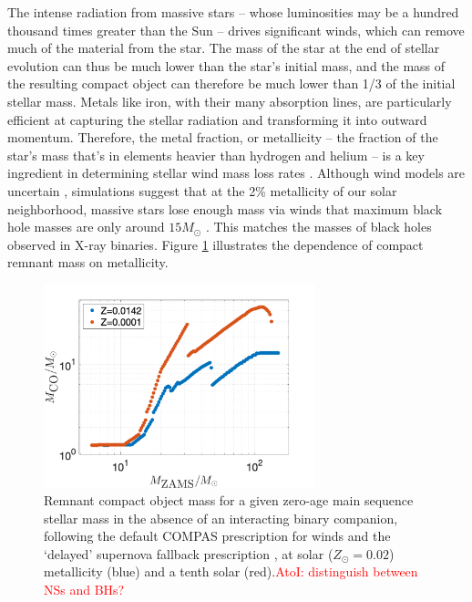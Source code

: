 \documentclass[iop,onecolumn]{revtex4}
\newcommand{\ajf}[1]{\textcolor{red}{AtoI: #1}}
\begin{document}
The intense radiation from massive stars -- whose luminosities may be a hundred thousand times greater than the Sun -- drives significant winds, which can remove much of the material from the star. The mass of the star at the end of stellar evolution can thus be much lower than the star's initial mass, and the mass of the resulting compact object can therefore be much lower than 1/3 of the initial stellar mass. Metals like iron, with their many absorption lines, are particularly efficient at capturing the stellar radiation and transforming it into outward momentum.  Therefore, the metal fraction, or metallicity -- the fraction of the star's mass that's in elements heavier than hydrogen and helium -- is a key ingredient in determining stellar wind mass loss rates \citep{Vink:2001}. Although wind models are uncertain \citep[e.g.,][]{Renzo:2017}, simulations suggest that at the 2\% metallicity of our solar neighborhood, massive stars lose enough mass via winds that maximum black hole masses are only around $15 M_\odot$ \citep{Belczynski:2009,Spera:2015}. This matches the masses of black holes observed in X-ray binaries. Figure \ref{fig:BHremnant} illustrates the dependence of compact remnant mass on metallicity. 
 
\begin{figure}
	\centering
	\includegraphics[width=0.7\textwidth]{BHremnantdelayed.png}
	\caption{\label{fig:BHremnant} Remnant compact object mass for a given zero-age main sequence stellar mass in the absence of an interacting binary companion, following the default COMPAS prescription for winds \citep{Stevenson:2017}  and the `delayed' supernova fallback prescription \citep{Fryer:2012}, at solar ($Z_\odot=0.02$) metallicity (blue) and a tenth solar (red).\ajf{distinguish between NSs and BHs?}} 
\end{figure}
\end{document}

